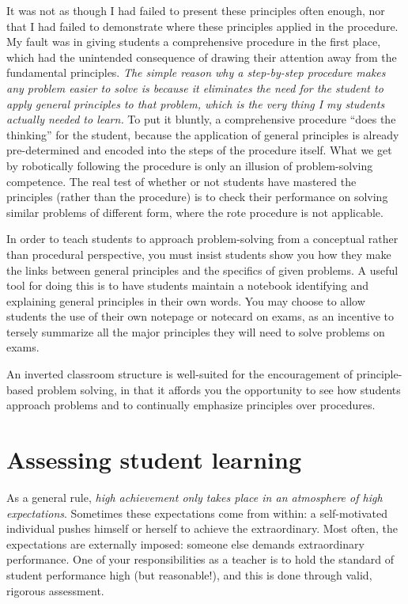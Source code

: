 It was not as though I had failed to present these principles often enough, nor that I had failed to demonstrate where these principles applied in the procedure.  My fault was in giving students a comprehensive procedure in the first place, which had the unintended consequence of drawing their attention away from the fundamental principles.  \textit{The simple reason why a step-by-step procedure makes any problem easier to solve is because it eliminates the need for the student to apply general principles to that problem, which is the very thing I my students actually needed to learn.}  To put it bluntly, a comprehensive procedure ``does the thinking'' for the student, because the application of general principles is already pre-determined and encoded into the steps of the procedure itself.  What we get by robotically following the procedure is only an illusion of problem-solving competence.  The real test of whether or not students have mastered the principles (rather than the procedure) is to check their performance on solving similar problems of different form, where the rote procedure is not applicable.

\vskip 10pt

In order to teach students to approach problem-solving from a conceptual rather than procedural perspective, you must insist students show you how they make the links between general principles and the specifics of given problems.  A useful tool for doing this is to have students maintain a notebook identifying and explaining general principles in their own words.  You may choose to allow students the use of their own notepage or notecard on exams, as an incentive to tersely summarize all the major principles they will need to solve problems on exams.  

An inverted classroom structure is well-suited for the encouragement of principle-based problem solving, in that it affords you the opportunity to see how students approach problems and to continually emphasize principles over procedures.









\filbreak
\section{Assessing student learning}

As a general rule, \textit{high achievement only takes place in an atmosphere of high expectations}.  Sometimes these expectations come from within: a self-motivated individual pushes himself or herself to achieve the extraordinary.  Most often, the expectations are externally imposed: someone else demands extraordinary performance.  One of your responsibilities as a teacher is to hold the standard of student performance high (but reasonable!), and this is done through valid, rigorous assessment.


